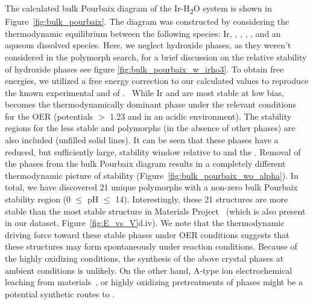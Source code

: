 %
%
The calculated bulk Pourbaix diagram of the Ir-H\textsubscript{2}O system is shown in Figure~\ref{fig:bulk_pourbaix}.
%
The diagram was constructed by considering the thermodynamic equilibrium between the following species: Ir, \rIrOtwo, \aIrOthree, \rIrOthree, \bIrOthree, and an aqueous dissolved \IrOfourm species.
%
Here, we neglect hydroxide phases, as they weren't considered in the polymorph search,
for a brief discussion on the relative stability of hydroxide phases see figure \ref{fig:bulk_pourbaix_w_irho3}.
%
To obtain free energies, we utilized a free energy correction to our calculated values to reproduce the known experimental \DHf and \DGf of \rIrOtwo.~\cite{Barin1995}
%
While Ir and \rIrOtwo are most stable at low bias, \aIrOthree becomes the thermodynamically dominant phase under the relevant conditions for the OER (potentials $>$ \num{1.23} \VRHE and in an acidic environment).
%
The stability regions for the less stable \bIrOthree and \rIrOthree polymorphs (in the absence of other \IrOthree phases) are also included (unfilled solid lines).
%
It can be seen that these phases have a reduced, but sufficiently large, stability window relative to \IrOtwo and the \IrOfourm.
%
Removal of the \IrOthree phases from the bulk Pourbaix diagram results in a completely different thermodynamic picture of \IrOtwo stability (Figure~\ref{fig:bulk_pourbaix_wo_alpha}).
In total, we have discovered 21 unique \IrOthree polymorphs with a non-zero bulk Pourbaix stability region
(0 $\leq$ pH $\leq$ 14).
%
Interestingly, these 21 structures are more stable than the most stable \IrOthree structure in Materials Project~\cite{mp-1097041} (which is also present in our dataset, Figure~\ref{fig:E_vs_V}d.iv).
%
We note that the thermodynamic driving force toward these stable \IrOthree phases under OER conditions suggests that these structures may form spontaneously under reaction conditions.
%
Because of the highly oxidizing conditions, the synthesis of the above \IrOthree crystal phases at ambient conditions is unlikely.
%
On the other hand,  A-type ion electrochemical leaching from  materials~\cite{Pearce2019, Seitz2016},
or highly oxidizing pretreatments of \IrOtwo phases might be a potential synthetic routes to \IrOthree.


